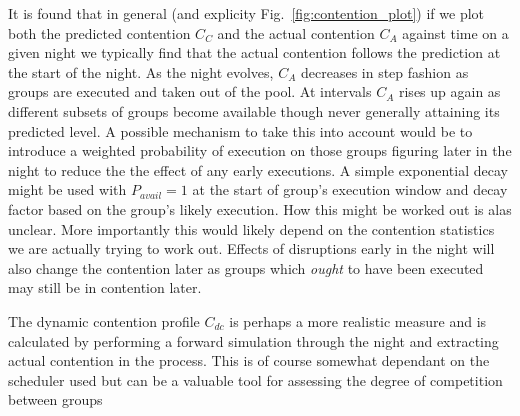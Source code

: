 It is found that in general (and explicity Fig.~\ref{fig:contention_plot}) if we plot both the predicted contention $C_C$ and the actual contention $C_A$ against time on a given night we typically find that the actual contention follows the prediction at the start of the night. As the night evolves, $C_A$ decreases in step fashion as groups are executed and taken out of the pool. At intervals $C_A$ rises up again as different subsets of groups become available though never generally attaining its predicted level. 
A possible mechanism to take this into account would be to introduce a weighted probability of execution on those groups figuring later in the night to reduce the the effect of any early executions. A simple exponential decay might be used with $P_{avail}=1$ at the start of group's execution window and decay factor based on the group's likely execution. How this might be worked out is alas unclear. More importantly this would likely depend on the contention statistics we are actually trying to work out. Effects of disruptions early in the night will also change the contention later as groups which \emph{ought} to have been executed may still be in contention later. 

The dynamic contention profile $C_{dc}$ is perhaps a more realistic measure and is calculated by performing a forward simulation through the night and extracting actual contention in the process. This is of course somewhat dependant on the scheduler used but can be a valuable tool for assessing the degree of competition between groups


